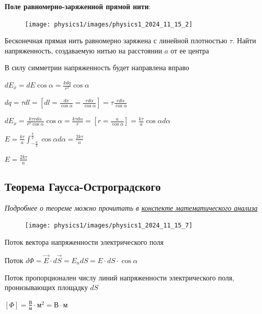 \documentclass[12pt]{article}
\begin{document}
    \mediumvspace

    

    \begin{minipage}{\textwidth}
        \textbf{Поле равномерно-заряженной прямой нити}:
        
        \begin{figure}
            \texttt{[image: physics1/images/physics1\_2024\_11\_15\_2]}
        \end{figure}

        Бесконечная прямая нить равномерно заряжена с линейной плотностью $\tau$.
        Найти напряженность, создаваемую нитью на расстоянии $a$ от ее центра 
    
        В силу симметрии напряженность будет направлена вправо
    
        $dE_x = dE \cos\alpha = \frac{kdq}{r^2} \cos\alpha$
    
        $dq = \tau dl = \left[dl = \frac{dx}{\cos\alpha} = \frac{rd\alpha}{\cos\alpha}\right] = \tau \frac{rd\alpha}{\cos\alpha}$
    
        $dE_x = \frac{k\tau rd\alpha}{r^2 \cos\alpha} \cos\alpha = \frac{k\tau d\alpha}{r} = \left[r = \frac{a}{\cos\alpha}\right] = 
        \frac{k\tau}{a}\cos\alpha d\alpha$
    
        $E = \frac{k\tau}{a} \int_{-\frac{\pi}{2}}^{\frac{\pi}{2}} \cos\alpha d\alpha = \frac{2k\tau}{a}$
    
        $E = \frac{2k\tau}{a}$
    \end{minipage}

   
    \subsection{Теорема Гаусса-Остроградского}

    \textit{Подробнее о теореме можно прочитать в \href{https://pelmesh619.github.io/itmo_conspects/conspects/calculus/calculus_superconspect.pdf}{конспекте математического анализа}}

    \mediumvspace

    \begin{minipage}{\textwidth}
        \begin{figure}
            \texttt{[image: physics1/images/physics1\_2024\_11\_15\_7]}
        \end{figure}

        Поток вектора напряженности электрического поля
    
        Поток $d\Phi = \vec{E}\cdot d\vec{S} = E_n dS = E \cdot dS \cdot \cos\alpha$

        Поток пропорционален числу линий напряженности электрического поля, пронизывающих площадку $dS$

        $[\Phi] = \frac{\text{В}}{\text{м}} \cdot \text{м}^2 = \text{В} \cdot \text{м}$

    \end{minipage}
\end{document}
